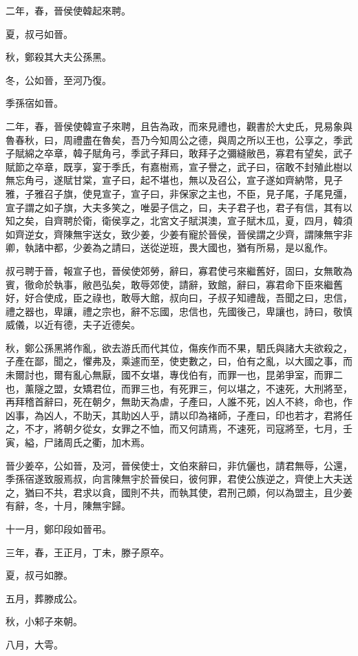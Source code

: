 \begin{pinyinscope}
二年，春，晉侯使韓起來聘。

夏，叔弓如晉。

秋，鄭殺其大夫公孫黑。

冬，公如晉，至河乃復。

季孫宿如晉。

二年，春，晉侯使韓宣子來聘，且告為政，而來見禮也，觀書於大史氏，見易象與魯春秋，曰，周禮盡在魯矣，吾乃今知周公之德，與周之所以王也，公享之，季武子賦綿之卒章，韓子賦角弓，季武子拜曰，敢拜子之彌縫敝邑，寡君有望矣，武子賦節之卒章，既享，宴于季氏，有嘉樹焉，宣子譽之，武子曰，宿敢不封殖此樹以無忘角弓，遂賦甘棠，宣子曰，起不堪也，無以及召公，宣子遂如齊納幣，見子雅，子雅召子旗，使見宣子，宣子曰，非保家之主也，不臣，見子尾，子尾見彊，宣子謂之如子旗，大夫多笑之，唯晏子信之，曰，夫子君子也，君子有信，其有以知之矣，自齊聘於衛，衛侯享之，北宮文子賦淇澳，宣子賦木瓜，夏，四月，韓須如齊逆女，齊陳無宇送女，致少姜，少姜有寵於晉侯，晉侯謂之少齊，謂陳無宇非卿，執諸中都，少姜為之請曰，送從逆班，畏大國也，猶有所易，是以亂作。

叔弓聘于晉，報宣子也，晉侯使郊勞，辭曰，寡君使弓來繼舊好，固曰，女無敢為賓，徹命於執事，敝邑弘矣，敢辱郊使，請辭，致館，辭曰，寡君命下臣來繼舊好，好合使成，臣之祿也，敢辱大館，叔向曰，子叔子知禮哉，吾聞之曰，忠信，禮之器也，卑讓，禮之宗也，辭不忘國，忠信也，先國後己，卑讓也，詩曰，敬慎威儀，以近有德，夫子近德矣。

秋，鄭公孫黑將作亂，欲去游氏而代其位，傷疾作而不果，駟氏與諸大夫欲殺之，子產在鄙，聞之，懼弗及，乘遽而至，使吏數之，曰，伯有之亂，以大國之事，而未爾討也，爾有亂心無厭，國不女堪，專伐伯有，而罪一也，昆弟爭室，而罪二也，薰隧之盟，女矯君位，而罪三也，有死罪三，何以堪之，不速死，大刑將至，再拜稽首辭曰，死在朝夕，無助天為虐，子產曰，人誰不死，凶人不終，命也，作凶事，為凶人，不助天，其助凶人乎，請以印為褚師，子產曰，印也若才，君將任之，不才，將朝夕從女，女罪之不恤，而又何請焉，不速死，司寇將至，七月，壬寅，縊，尸諸周氏之衢，加木焉。

晉少姜卒，公如晉，及河，晉侯使士，文伯來辭曰，非伉儷也，請君無辱，公還，季孫宿遂致服焉叔，向言陳無宇於晉侯曰，彼何罪，君使公族逆之，齊使上大夫送之，猶曰不共，君求以貪，國則不共，而執其使，君刑己頗，何以為盟主，且少姜有辭，冬，十月，陳無宇歸。

十一月，鄭印段如晉弔。

三年，春，王正月，丁未，滕子原卒。

夏，叔弓如滕。

五月，葬滕成公。

秋，小邾子來朝。

八月，大雩。


\end{pinyinscope}

